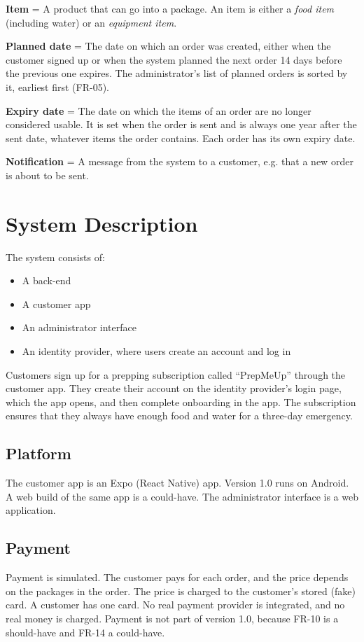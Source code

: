 \documentclass[a4paper,11pt]{article}
\begin{document}
\textbf{Item} = A product that can go into a package. An item is either a \emph{food item} (including water) or an \emph{equipment item}.

\textbf{Planned date} = The date on which an order was created, either when the customer signed up or when the system planned the next order 14 days before the previous one expires. The administrator's list of planned orders is sorted by it, earliest first (FR-05).

\textbf{Expiry date} = The date on which the items of an order are no longer considered usable. It is set when the order is sent and is always one year after the sent date, whatever items the order contains. Each order has its own expiry date.

\textbf{Notification} = A message from the system to a customer, e.g. that a new order is about to be sent.

\section{System Description}
The system consists of:
\begin{itemize}
    \item A back-end
    \item A customer app
    \item An administrator interface
    \item An identity provider, where users create an account and log in
\end{itemize}

Customers sign up for a prepping subscription called ``PrepMeUp'' through the customer app. They create their account on the identity provider's login page, which the app opens, and then complete onboarding in the app. The subscription ensures that they always have enough food and water for a three-day emergency.

\subsection{Platform}
The customer app is an Expo (React Native) app. Version 1.0 runs on Android. A web build of the same app is a could-have. The administrator interface is a web application.

\subsection{Payment}
Payment is simulated. The customer pays for each order, and the price depends on the packages in the order. The price is charged to the customer's stored (fake) card. A customer has one card. No real payment provider is integrated, and no real money is charged. Payment is not part of version 1.0, because FR-10 is a should-have and FR-14 a could-have.
\end{document}
